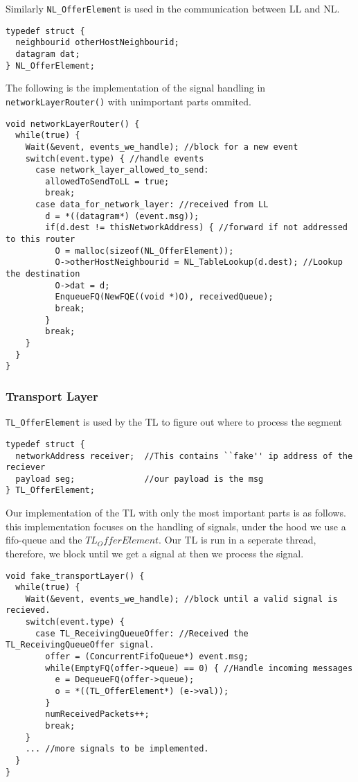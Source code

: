 Similarly \texttt{NL\_OfferElement} is used in the communication between LL and NL.
\begin{lstlisting}
typedef struct {
  neighbourid otherHostNeighbourid;
  datagram dat;
} NL_OfferElement;
\end{lstlisting}

The following is the implementation of the signal handling in \texttt{networkLayerRouter()} with unimportant parts ommited.
\begin{lstlisting}
void networkLayerRouter() {
  while(true) {
    Wait(&event, events_we_handle); //block for a new event
    switch(event.type) { //handle events
      case network_layer_allowed_to_send:
        allowedToSendToLL = true;
        break;
      case data_for_network_layer: //received from LL
        d = *((datagram*) (event.msg));
        if(d.dest != thisNetworkAddress) { //forward if not addressed to this router
          O = malloc(sizeof(NL_OfferElement));
          O->otherHostNeighbourid = NL_TableLookup(d.dest); //Lookup the destination
          O->dat = d;
          EnqueueFQ(NewFQE((void *)O), receivedQueue);
          break;
        }
        break;
    }
  }
}
\end{lstlisting}



\subsubsection{Transport Layer}

\texttt{TL\_OfferElement} is used by the TL to figure out where to process the segment
\begin{lstlisting}
typedef struct {
  networkAddress receiver;  //This contains ``fake'' ip address of the reciever
  payload seg;              //our payload is the msg
} TL_OfferElement;
\end{lstlisting}
\break

Our implementation of the TL with only the most important parts is as follows.
this implementation focuses on the handling of signals, under the hood we use a fifo-queue and the $TL_OfferElement$.
Our TL is run in a seperate thread, therefore, we block until we get a signal at then we process the signal.
\begin{lstlisting}
void fake_transportLayer() {
  while(true) {
    Wait(&event, events_we_handle); //block until a valid signal is recieved.
    switch(event.type) {
      case TL_ReceivingQueueOffer: //Received the TL_ReceivingQueueOffer signal.
        offer = (ConcurrentFifoQueue*) event.msg;
        while(EmptyFQ(offer->queue) == 0) { //Handle incoming messages
          e = DequeueFQ(offer->queue);
          o = *((TL_OfferElement*) (e->val));
        }
        numReceivedPackets++;
        break;
    }
    ... //more signals to be implemented.
  }
}
\end{lstlisting}

